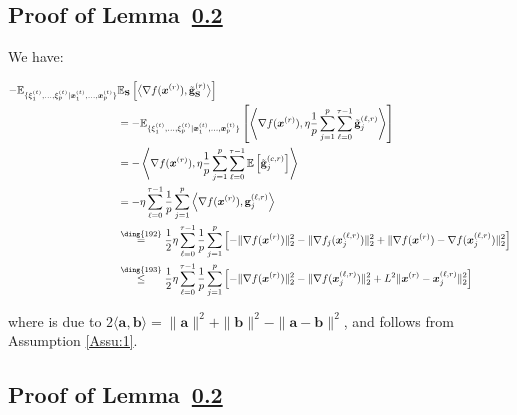 \subsection{Proof of Lemma~\ref{}}
We have:

\begin{align}
    -\mathbb{E}_{\{{\xi}^{(t)}_{1}, \ldots, {\xi}^{(t)}_{p}|{\boldsymbol{x}}^{(t)}_{1},\ldots,  {\boldsymbol{x}}^{(t)}_{p}\}} &\mathbb{E}_\mathbf{S}\left[ \big\langle\nabla f({\boldsymbol{x}}^{(r)}),\tilde{\mathbf{g}}_\mathbf{S}^{(r)}\big\rangle\right]\nonumber\\
    &=-\mathbb{E}_{\{{\xi}^{(t)}_{1}, \ldots, {\xi}^{(t)}_{p}|{\boldsymbol{x}}^{(t)}_{1},\ldots,  {\boldsymbol{x}}^{(t)}_{p}\}}\left[\left\langle \nabla f({\boldsymbol{x}}^{(r)}),\eta\frac{1}{p}\sum_{j=1}^p\sum_{\ell=0}^{\tau-1}\tilde{\mathbf{g}}_j^{(\ell,r)}\right\rangle\right]\nonumber\\
    &=-\left\langle \nabla f({\boldsymbol{x}}^{(r)}),\eta\frac{1}{p}\sum_{j=1}^p\sum_{\ell=0}^{\tau-1}\mathbb{E}\left[\tilde{\mathbf{g}}_j^{(c,r)}\right]\right\rangle\nonumber\\
        &=-\eta\sum_{\ell=0}^{\tau-1}\frac{1}{p}\sum_{j=1}^p\left\langle \nabla f({\boldsymbol{x}}^{(r)}),{\mathbf{g}}_j^{(\ell,r)}\right\rangle\nonumber\\ 
     &\stackrel{\text{\ding{192}}}{=}\frac{1}{2}\eta\sum_{\ell=0}^{\tau-1}\frac{1}{p}\sum_{j=1}^p\left[-\|\nabla f({\boldsymbol{x}}^{(r)})\|_2^2-\|\nabla{f}_j(\boldsymbol{x}_j^{(\ell,r)})\|_2^2+\|\nabla f({\boldsymbol{x}}^{(r)})-\nabla{f}(\boldsymbol{x}_j^{(\ell,r)})\|_2^2\right]\nonumber\\
    &\stackrel{\text{\ding{193}}}{\leq}\frac{1}{2}\eta\sum_{\ell=0}^{\tau-1}\frac{1}{p}\sum_{j=1}^p\left[-\|\nabla f({\boldsymbol{x}}^{(r)})\|_2^2-\|\nabla{f}(\boldsymbol{x}_j^{(\ell,r)})\|_2^2+L^2\|{\boldsymbol{x}}^{(r)}-\boldsymbol{x}_j^{(\ell,r)}\|_2^2\right]
   \label{eq:bounding-cross-no-redundancy}
\end{align}

where  is due to $2\langle \mathbf{a},\mathbf{b}\rangle=\|\mathbf{a}\|^2+\|\mathbf{b}\|^2-\|\mathbf{a}-\mathbf{b}\|^2$, and  follows from Assumption \ref{Assu:1}.

\subsection{Proof of Lemma~\ref{}}

